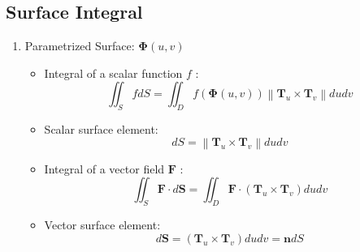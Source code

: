 \documentclass[11pt]{article}
\begin{document}
\subsection{Surface Integral}
\begin{enumerate}
    \item Parametrized Surface: $\boldsymbol{\Phi}(u, v)$
    \begin{itemize}
        \item[a.] Integral of a scalar function $f$ :
        $$
        \iint_{S} f d S=\iint_{D} f(\boldsymbol{\Phi}(u, v))\left\|\mathbf{T}_{u} \times \mathbf{T}_{v}\right\| d u d v
        $$
        \item[b.] Scalar surface element:
        $$
        d S=\left\|\mathbf{T}_{u} \times \mathbf{T}_{v}\right\| d u d v
        $$

        \item[c.] Integral of a vector field $\mathbf{F}$ :
        $$
        \iint_{S} \mathbf{F} \cdot d \mathbf{S}=\iint_{D} \mathbf{F} \cdot\left(\mathbf{T}_{u} \times \mathbf{T}_{v}\right) d u d v
        $$
        \item[d.] Vector surface element:
        $$
        d \mathbf{S}=\left(\mathbf{T}_{u} \times \mathbf{T}_{v}\right) d u d v=\mathbf{n} d S
        $$
    \end{itemize}


\end{enumerate}
\end{document}
